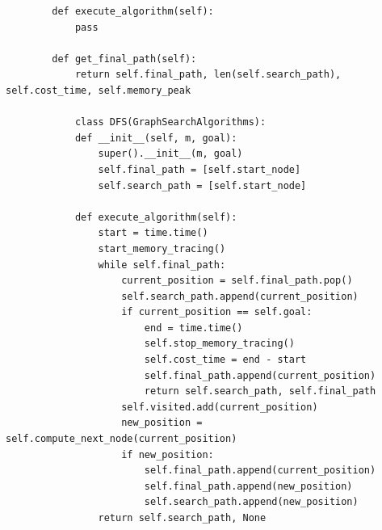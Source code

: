 \documentclass{article}
\begin{document}
\begin{lstlisting}
        def execute_algorithm(self):
            pass

        def get_final_path(self):
            return self.final_path, len(self.search_path), self.cost_time, self.memory_peak

            class DFS(GraphSearchAlgorithms):
            def __init__(self, m, goal):
                super().__init__(m, goal)
                self.final_path = [self.start_node]
                self.search_path = [self.start_node]
        
            def execute_algorithm(self):
                start = time.time()
                start_memory_tracing()
                while self.final_path:
                    current_position = self.final_path.pop()
                    self.search_path.append(current_position)
                    if current_position == self.goal:
                        end = time.time()
                        self.stop_memory_tracing()
                        self.cost_time = end - start
                        self.final_path.append(current_position)
                        return self.search_path, self.final_path
                    self.visited.add(current_position)
                    new_position = self.compute_next_node(current_position)
                    if new_position:
                        self.final_path.append(current_position)
                        self.final_path.append(new_position)
                        self.search_path.append(new_position)
                return self.search_path, None
\end{lstlisting}
\end{document}
